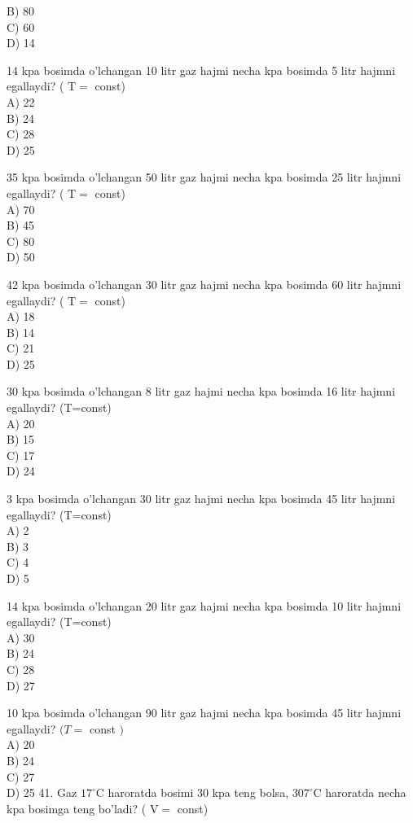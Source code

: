 B) 80\\
C) 60\\
D) 14
  \item 14 kpa bosimda o'lchangan 10 litr gaz hajmi necha kpa bosimda 5 litr hajmni egallaydi? ( $\mathrm{T}=$ const)\\
A) 22\\
B) 24\\
C) 28\\
D) 25
  \item 35 kpa bosimda o'lchangan 50 litr gaz hajmi necha kpa bosimda 25 litr hajmni egallaydi? ( $\mathrm{T}=$ const)\\
A) 70\\
B) 45\\
C) 80\\
D) 50
  \item 42 kpa bosimda o'lchangan 30 litr gaz hajmi necha kpa bosimda 60 litr hajmni egallaydi? ( $\mathrm{T}=$ const)\\
A) 18\\
B) 14\\
C) 21\\
D) 25
  \item 30 kpa bosimda o'lchangan 8 litr gaz hajmi necha kpa bosimda 16 litr hajmni egallaydi? (T=const)\\
A) 20\\
B) 15\\
C) 17\\
D) 24
  \item 3 kpa bosimda o'lchangan 30 litr gaz hajmi necha kpa bosimda 45 litr hajmni egallaydi? (T=const)\\
A) 2\\
B) 3\\
C) 4\\
D) 5
  \item 14 kpa bosimda o'lchangan 20 litr gaz hajmi necha kpa bosimda 10 litr hajmni egallaydi? (T=const)\\
A) 30\\
B) 24\\
C) 28\\
D) 27
  \item 10 kpa bosimda o'lchangan 90 litr gaz hajmi necha kpa bosimda 45 litr hajmni egallaydi? $(T=$ const $)$\\
A) 20\\
B) 24\\
C) 27\\
D) 25
41. Gaz $17^{\circ} \mathrm{C}$ haroratda bosimi 30 kpa teng bolsa, $307^{\circ} \mathrm{C}$ haroratda necha kpa bosimga teng bo'ladi? ( $\mathrm{V}=$ const)\\
